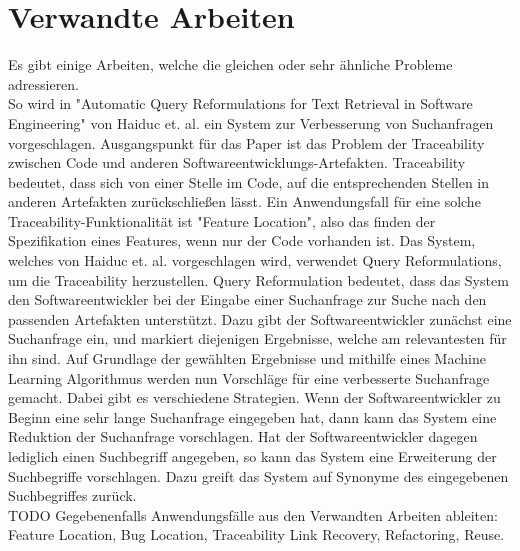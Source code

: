 \section{Verwandte Arbeiten}

Es gibt einige Arbeiten, welche die gleichen oder sehr ähnliche Probleme adressieren.\\

So wird in "Automatic Query Reformulations for Text Retrieval in Software Engineering" von Haiduc et. al. ein System zur Verbesserung von Suchanfragen vorgeschlagen.
Ausgangspunkt für das Paper ist das Problem der Traceability zwischen Code und anderen Softwareentwicklungs-Artefakten.
Traceability bedeutet, dass sich von einer Stelle im Code, auf die entsprechenden Stellen in anderen Artefakten zurückschließen lässt.
Ein Anwendungsfall für eine solche Traceability-Funktionalität ist "Feature Location", also das finden der Spezifikation eines Features, wenn nur der Code vorhanden ist.
Das System, welches von Haiduc et. al. vorgeschlagen wird, verwendet Query Reformulations, um die Traceability herzustellen.
Query Reformulation bedeutet, dass das System den Softwareentwickler bei der Eingabe einer Suchanfrage zur Suche nach den passenden Artefakten unterstützt.
Dazu gibt der Softwareentwickler zunächst eine Suchanfrage ein, und markiert diejenigen Ergebnisse, welche am relevantesten für ihn sind.
Auf Grundlage der gewählten Ergebnisse und mithilfe eines Machine Learning Algorithmus werden nun Vorschläge für eine verbesserte Suchanfrage gemacht.
Dabei gibt es verschiedene Strategien.
Wenn der Softwareentwickler zu Beginn eine sehr lange Suchanfrage eingegeben hat, dann kann das System eine Reduktion der Suchanfrage vorschlagen.
Hat der Softwareentwickler dagegen lediglich einen Suchbegriff angegeben, so kann das System eine Erweiterung der Suchbegriffe vorschlagen.
Dazu greift das System auf Synonyme des eingegebenen Suchbegriffes zurück.\\

TODO Gegebenenfalls Anwendungsfälle aus den Verwandten Arbeiten ableiten: Feature Location, Bug Location, Traceability Link Recovery, Refactoring, Reuse.\\

